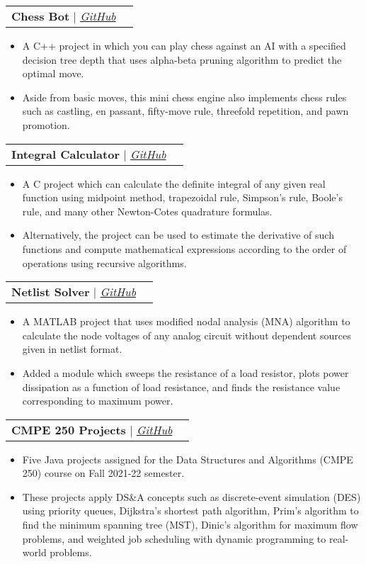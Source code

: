 \documentclass[letterpaper,11pt]{article}
\makeatletter
\newcommand{\resumeItem}[1]{
  \item\small{
    {#1 \vspace{-2pt}}
  }
}
\newcommand{\resumeProjectHeading}[2]{
    \item
    \begin{tabular*}{0.97\textwidth}{l@{\extracolsep{\fill}}r}
      \small#1 & #2 \\
    \end{tabular*}\vspace{-7pt}
}
\newcommand{\resumeItemListStart}{\begin{itemize}}
\newcommand{\resumeItemListEnd}{\end{itemize}\vspace{-5pt}}
\makeatother
\begin{document}
      \resumeProjectHeading
        {\textbf{Chess Bot} $|$ \emph{\href{https://github.com/arasgungore/chess-bot}{\color{blue}GitHub}}}{}
          \resumeItemListStart
            \resumeItem{A C++ project in which you can play chess against an AI with a specified decision tree depth that uses alpha-beta pruning algorithm to predict the optimal move.}
            \resumeItem{Aside from basic moves, this mini chess engine also implements chess rules such as castling, en passant, fifty-move rule, threefold repetition, and pawn promotion.}
          \resumeItemListEnd
      
      \resumeProjectHeading
        {\textbf{Integral Calculator} $|$ \emph{\href{https://github.com/arasgungore/integral-calculator}{\color{blue}GitHub}}}{}
          \resumeItemListStart
            \resumeItem{A C project which can calculate the definite integral of any given real function using midpoint method, trapezoidal rule, Simpson's rule, Boole's rule, and many other Newton-Cotes quadrature formulas.}
            \resumeItem{Alternatively, the project can be used to estimate the derivative of such functions and compute mathematical expressions according to the order of operations using recursive algorithms.}
          \resumeItemListEnd
      
      \resumeProjectHeading
        {\textbf{Netlist Solver} $|$ \emph{\href{https://github.com/arasgungore/netlist-solver}{\color{blue}GitHub}}}{}
          \resumeItemListStart
            \resumeItem{A MATLAB project that uses modified nodal analysis (MNA) algorithm to calculate the node voltages of any analog circuit without dependent sources given in netlist format.}
            \resumeItem{Added a module which sweeps the resistance of a load resistor, plots power dissipation as a function of load resistance, and finds the resistance value corresponding to maximum power.}
          \resumeItemListEnd
      
      \resumeProjectHeading
        {\textbf{CMPE 250 Projects} $|$ \emph{\href{https://github.com/arasgungore/cmpe250-projects}{\color{blue}GitHub}}}{}
          \resumeItemListStart
            \resumeItem{Five Java projects assigned for the Data Structures and Algorithms (CMPE 250) course on Fall 2021-22 semester.}
            \resumeItem{These projects apply DS\&A concepts such as discrete-event simulation (DES) using priority queues, Dijkstra's shortest path algorithm, Prim's algorithm to find the minimum spanning tree (MST), Dinic's algorithm for maximum flow problems, and weighted job scheduling with dynamic programming to real-world problems.}
          \resumeItemListEnd
      
\end{document}
